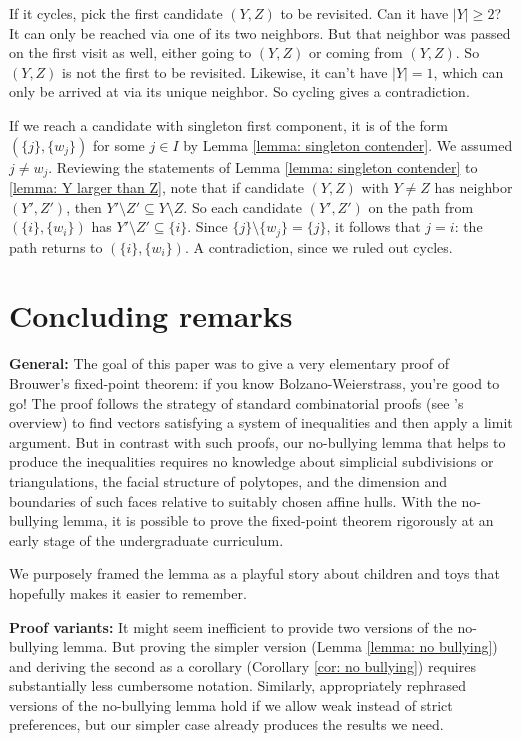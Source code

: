 \documentclass[english, 11pt]{article}
\theoremstyle{plain} %
\theoremstyle{definition}
\begin{document}
If it cycles, pick the first candidate $(Y,Z)$ to be revisited. Can it have $|Y| \geq 2$? It can only be reached via one of its two neighbors. But that neighbor was passed on the first visit as well, either going to $(Y,Z)$ or coming from $(Y,Z)$. So $(Y,Z)$ is not the first to be revisited. Likewise, it can't have $|Y| = 1$, which can only be arrived at via its unique neighbor. So cycling gives a contradiction.

If we reach a candidate with singleton first component, it is of the form $(\{j\}, \{w_j\})$ for some $j \in I$ by Lemma \ref{lemma: singleton contender}. We assumed $j \neq w_j$. Reviewing the statements of Lemma \ref{lemma: singleton contender} to \ref{lemma: Y larger than Z}, note that if candidate $(Y,Z)$ with $Y \neq Z$ has neighbor $(Y',Z')$, then $Y' \setminus Z' \subseteq Y \setminus Z$. So each candidate $(Y',Z')$ on the path from $(\{i\}, \{w_i\})$ has $Y' \setminus Z' \subseteq \{i\}$. Since $\{j\} \setminus \{w_j\} = \{j\}$, it follows that $j = i$: the path returns to $(\{i\}, \{w_i\})$. A contradiction, since we ruled out cycles.

\section{Concluding remarks}\label{sec: conclusion}

\textbf{General:} The goal of this paper was to give a very elementary proof of Brouwer's fixed-point theorem: if you know Bolzano-Weierstrass, you're good to go! The proof follows the strategy of standard combinatorial proofs (see \citeauthor{Scarf1982}'s \citeyearpar{Scarf1982} overview) to find vectors satisfying a system of inequalities and then apply a limit argument. But in contrast with such proofs, our no-bullying lemma that helps to produce the inequalities requires no knowledge about simplicial subdivisions or triangulations, the facial structure of polytopes, and the dimension and boundaries of such faces relative to suitably chosen affine hulls. With the no-bullying lemma, it is possible to prove the fixed-point theorem rigorously at an early stage of the undergraduate curriculum.

We purposely framed the lemma as a playful story about children and toys that hopefully makes it easier to remember.

\textbf{Proof variants:} It might seem inefficient to provide two versions of the no-bullying lemma. But proving the simpler version (Lemma \ref{lemma: no bullying}) and deriving the second as a corollary (Corollary \ref{cor: no bullying}) requires substantially less cumbersome notation. Similarly, appropriately rephrased versions of the no-bullying lemma hold if we allow weak instead of strict preferences, but our simpler case already produces the results we need.
\end{document}
